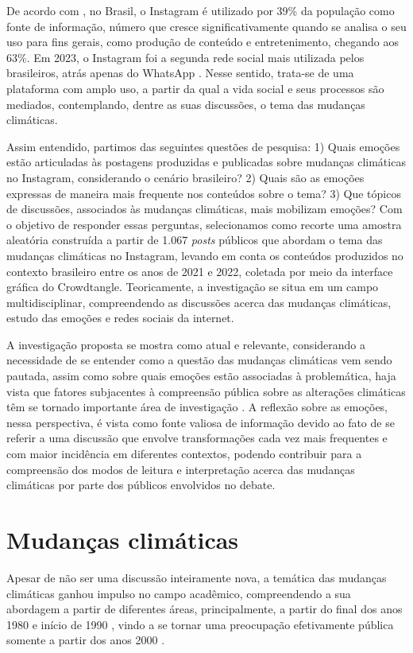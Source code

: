 \documentclass[portuguese]{textolivre}
\begin{document}
De acordo com \textcite{newman2023reuters}, no Brasil, o Instagram é utilizado por 39\% da população como fonte de informação, número que cresce significativamente quando se analisa o seu uso para fins gerais, como produção de conteúdo e entretenimento, chegando aos 63\%. Em 2023, o Instagram foi a segunda rede social mais utilizada pelos brasileiros, atrás apenas do WhatsApp \cite{bianchi2024socialmedia}. Nesse sentido, trata-se de uma plataforma com amplo uso, a partir da qual a vida social e seus processos são mediados, contemplando, dentre as suas discussões, o tema das mudanças climáticas.

Assim entendido, partimos das seguintes questões de pesquisa: 1) Quais emoções estão articuladas às postagens produzidas e publicadas sobre mudanças climáticas no Instagram, considerando o cenário brasileiro? 2) Quais são as emoções expressas de maneira mais frequente nos conteúdos sobre o tema? 3) Que tópicos de discussões, associados às mudanças climáticas, mais mobilizam emoções? Com o objetivo de responder essas perguntas, selecionamos como recorte uma amostra aleatória construída a partir de 1.067 \textit{posts} públicos que abordam o tema das mudanças climáticas no Instagram, levando em conta os conteúdos produzidos no contexto brasileiro entre os anos de 2021 e 2022, coletada por meio da interface gráfica do Crowdtangle. Teoricamente, a investigação se situa em um campo multidisciplinar, compreendendo as discussões acerca das mudanças climáticas, estudo das emoções e redes sociais da internet.

A investigação proposta se mostra como atual e relevante, considerando a necessidade de se entender como a questão das mudanças climáticas vem sendo pautada, assim como sobre quais emoções estão associadas à problemática, haja vista que fatores subjacentes à compreensão pública sobre as alterações climáticas têm se tornado importante área de investigação \cite{lu2015incidental}. A reflexão sobre as emoções, nessa perspectiva, é vista como fonte valiosa de informação devido ao fato de se referir a uma discussão que envolve transformações cada vez mais frequentes e com maior incidência em diferentes contextos, podendo contribuir para a compreensão dos modos de leitura e interpretação acerca das mudanças climáticas por parte dos públicos envolvidos no debate.

\section{Mudanças climáticas}\label{sec-normas}
Apesar de não ser uma discussão inteiramente nova, a temática das mudanças climáticas ganhou impulso no campo acadêmico, compreendendo a sua abordagem a partir de diferentes áreas, principalmente, a partir do final dos anos 1980 e início de 1990 \cite{chakrabarty2009climate}, vindo a se tornar uma preocupação efetivamente pública somente a partir dos anos 2000 \cite{fleury2019mudancas}.
\end{document}
